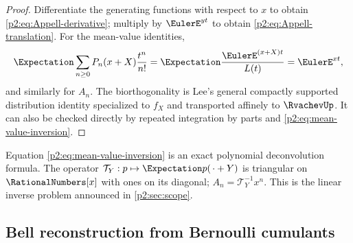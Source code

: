 \documentclass[11pt,oneside]{article}
\numberwithin{equation}{section}
\theoremstyle{definition}
\theoremstyle{remark}
\begin{document}
\begin{proof}
Differentiate the generating functions with respect to $x$ to obtain
\eqref{p2:eq:Appell-derivative}; multiply by $\EulerE^{yt}$ to obtain
\eqref{p2:eq:Appell-translation}.  For the mean-value identities,
\[
 \Expectation\sum_{n\ge0}P_n(x+X)\frac{t^n}{n!}
 =\Expectation\frac{\EulerE^{(x+X)t}}{L(t)}=\EulerE^{xt},
\]
and similarly for $A_n$.  The biorthogonality is Lee's general compactly supported
distribution identity specialized to $f_X$ and transported affinely to $\RvachevUp$.  It can also be checked
directly by repeated integration by parts and \eqref{p2:eq:mean-value-inversion}.
\end{proof}

\begin{remark}
Equation \eqref{p2:eq:mean-value-inversion} is an exact polynomial deconvolution formula.  The operator
$\mathcal T_Y:p\mapsto\Expectation p(\,\cdot+Y)$ is triangular on
$\RationalNumbers[x]$ with ones on its diagonal;
$A_n=\mathcal T_Y^{-1}x^n$.  This is the linear inverse problem announced in
\cref{p2:sec:scope}.
\end{remark}

\subsection{Bell reconstruction from Bernoulli cumulants}
\end{document}
